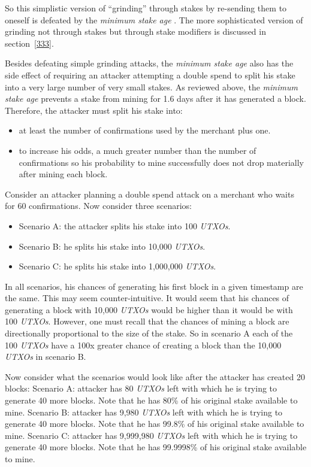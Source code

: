 \documentclass[a4paper,11pt]{article}
\begin{document}
So this simplistic version of ``grinding'' through stakes by re-sending them to oneself is defeated by the \textit{minimum stake age} . The more sophisticated version of grinding not through stakes but through stake modifiers is discussed in section~\ref{333}.


Besides defeating simple grinding attacks, the \textit{minimum stake age} also has the side effect of requiring an attacker attempting a double spend to split his stake into a very large number of very small stakes. As reviewed above, the \textit{minimum stake age} prevents a stake from mining for 1.6 days after it has generated a block. Therefore, the attacker must split his stake into:
\begin{itemize}
\setlength{\itemsep}{0pt}
\item{at least the number of confirmations used by the merchant plus one.}
\item{to increase his odds, a much greater number than the number of confirmations so his probability to mine successfully does not drop materially after mining each block.}
\end{itemize}


Consider an attacker planning a double spend attack on a merchant who waits for 60 confirmations. Now consider three scenarios:
\begin{itemize}
\setlength{\itemsep}{0pt}
\item{Scenario A: the attacker splits his stake into 100 \textit{UTXOs}.}
\item{Scenario B: he splits his stake into 10,000 \textit{UTXOs}.}
\item{Scenario C: he splits his stake into 1,000,000 \textit{UTXOs}.}
\end{itemize}

In all scenarios, his chances of generating his first block in a given timestamp are the same. This may seem counter-intuitive. It would seem that his chances of generating a block with 10,000 \textit{UTXOs} would be higher than it would be with 100 \textit{UTXOs}. However, one must recall that the chances of mining a block are directionally proportional to the size of the stake. So in scenario A each of the 100 \textit{UTXOs} have a 100x greater chance of creating a block than the 10,000 \textit{UTXOs} in scenario B.

Now consider what the scenarios would look like after the attacker has created 20 blocks:
Scenario A: attacker has 80 \textit{UTXOs} left with which he is trying to generate 40 more blocks. Note that he has 80\% of his original stake available to mine.
Scenario B: attacker has 9,980 \textit{UTXOs} left with which he is trying to generate 40 more blocks.
Note that he has 99.8\% of his original stake available to mine.
Scenario C: attacker has 9,999,980 \textit{UTXOs} left with which he is trying to generate 40 more blocks. Note that he has 99.9998\% of his original stake available to mine.
\end{document}
